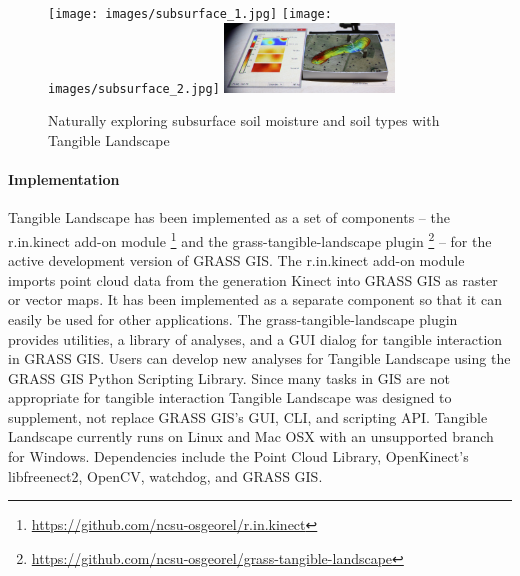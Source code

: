 \documentclass[prodmode,acmtochi]{acmsmall} %
\begin{document}
\begin{figure}[h!]
\begin{center}
		\texttt{[image: images/subsurface\_1.jpg]}
		\texttt{[image: images/subsurface\_2.jpg]}
		\includegraphics[height=70px]{images/subsurface_3.jpg}
	\caption{Naturally exploring subsurface soil moisture and soil types with Tangible Landscape}
	\label{fig:subsurface}
\end{center}
\end{figure}

\paragraph{Implementation}
Tangible Landscape has been implemented as a set of components 
-- the r.in.kinect add-on module 
\footnote{\url{https://github.com/ncsu-osgeorel/r.in.kinect}}
and the grass-tangible-landscape plugin 
\footnote{\url{https://github.com/ncsu-osgeorel/grass-tangible-landscape}} --
for the active development version of GRASS GIS. 
%
The r.in.kinect add-on module imports point cloud data from the  generation Kinect into GRASS GIS as raster or vector maps. 
It has been implemented as a separate component so that it can easily be used for other applications.
%
The grass-tangible-landscape plugin provides 
utilities, a library of analyses, and a GUI dialog for tangible interaction in GRASS GIS.
%
Users can develop new analyses for Tangible Landscape 
using the GRASS GIS Python Scripting Library.  %
%
Since many tasks in GIS are not appropriate for tangible interaction
Tangible Landscape was designed to supplement, 
not replace GRASS GIS's GUI, CLI, and scripting API. 
%
Tangible Landscape currently runs on Linux and Mac OSX 
with an unsupported branch for Windows. 
%
Dependencies include the Point Cloud Library, OpenKinect's libfreenect2, 
OpenCV,  watchdog, and GRASS GIS.
\end{document}
